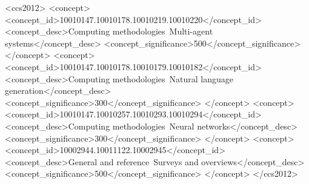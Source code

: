 \documentclass[acmsmall,nonacm]{acmart}
\begin{document}
\begin{CCSXML}
<ccs2012>
   <concept>
       <concept_id>10010147.10010178.10010219.10010220</concept_id>
       <concept_desc>Computing methodologies~Multi-agent systems</concept_desc>
       <concept_significance>500</concept_significance>
       </concept>
   <concept>
       <concept_id>10010147.10010178.10010179.10010182</concept_id>
       <concept_desc>Computing methodologies~Natural language generation</concept_desc>
       <concept_significance>300</concept_significance>
       </concept>
   <concept>
       <concept_id>10010147.10010257.10010293.10010294</concept_id>
       <concept_desc>Computing methodologies~Neural networks</concept_desc>
       <concept_significance>300</concept_significance>
       </concept>
   <concept>
       <concept_id>10002944.10011122.10002945</concept_id>
       <concept_desc>General and reference~Surveys and overviews</concept_desc>
       <concept_significance>500</concept_significance>
       </concept>
 </ccs2012>
\end{CCSXML}






\maketitle
\end{document}
